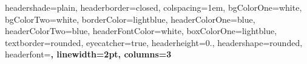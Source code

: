\documentclass[landscape,a1paper,fontscale=0.5]{baposter} %
\begin{document}
\begin{poster}
{
headershade=plain,
headerborder=closed, %
colspacing=1em, %
bgColorOne=white, %
bgColorTwo=white, %
borderColor=lightblue, %
headerColorOne=blue, %
headerColorTwo=blue, %
headerFontColor=white, %
boxColorOne=lightblue, %
textborder=rounded, %
eyecatcher=true, %
headerheight=0.\textheight, %
headershape=rounded, %
headerfont=\Large\bf\textsf, %
linewidth=2pt, %
columns=3
}
%
{} %
{} %
{} %
{} %

\sffamily
{}


\end{poster}
\end{document}
